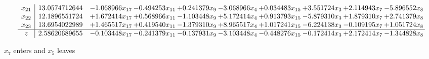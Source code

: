 \documentclass[10pt]{article}
\begin{document}
\[\begin{array}{c| c c@{\hskip 2pt} c@{\hskip 2pt} c@{\hskip 2pt} c@{\hskip 2pt} c@{\hskip 2pt} c@{\hskip 2pt} c@{\hskip 2pt} c@{\hskip 2pt} }
 x_{21}   &  13.0574712644 & -1.068966 x_{17} & -0.494253 x_{11} & + 0.241379 x_{9} & -3.068966 x_{4} & + 0.034483 x_{15} & + 3.551724 x_{3} & + 2.114943 x_{7} & -5.896552 x_{8}\\
 x_{22}   &  12.1896551724 & + 1.672414 x_{17} & + 0.568966 x_{11} & -1.103448 x_{9} & + 5.172414 x_{4} & + 0.913793 x_{15} & -5.879310 x_{3} & + 1.879310 x_{7} & + 2.741379 x_{8}\\
 x_{23}   &  13.6954022989 & + 1.465517 x_{17} & + 0.419540 x_{11} & -1.379310 x_{9} & + 8.965517 x_{4} & + 1.017241 x_{15} & -6.224138 x_{3} & -0.109195 x_{7} & + 1.051724 x_{8}\\
\hline
z    &  2.58620689655 & -0.103448 x_{17} & -0.241379 x_{11} & -0.137931 x_{9} & -3.103448 x_{4} & -0.448276 x_{15} & -0.172414 x_{3} & + 2.172414 x_{7} & -1.344828 x_{8}\\
\end{array}\]


 $ x_{7} $ enters and $ x_{5} $ leaves 
\end{document}
